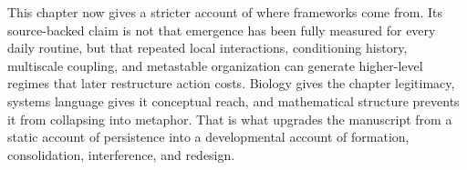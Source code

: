 \begin{summarybox}
This chapter now gives a stricter account of where frameworks come from. Its
source-backed claim is not that emergence has been fully measured for every
daily routine, but that repeated local interactions, conditioning history,
multiscale coupling, and metastable organization can generate higher-level
regimes that later restructure action costs. Biology gives the chapter
legitimacy, systems language gives it conceptual reach, and mathematical
structure prevents it from collapsing into metaphor. That is what upgrades the
manuscript from a static account of persistence into a developmental account of
formation, consolidation, interference, and redesign.
\end{summarybox}
